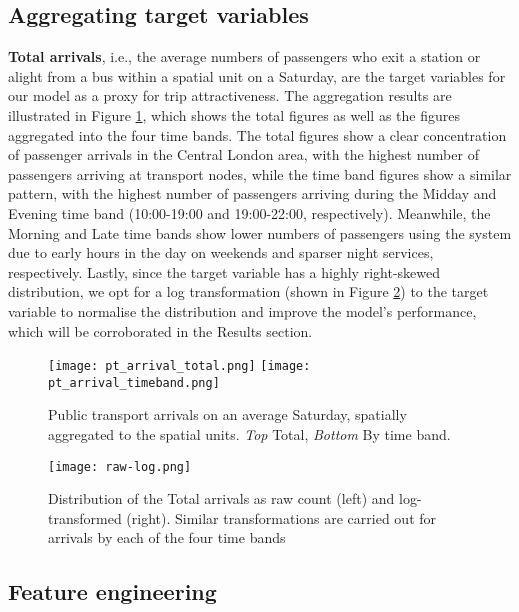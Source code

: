 \subsection{Aggregating target variables}

\textbf{Total arrivals}, i.e., the average numbers of passengers who exit a station or alight from a bus within a spatial unit on a Saturday, are the target variables for our model as a proxy for trip attractiveness. The aggregation results are illustrated in Figure \ref{fig:ptarrival}, which shows the total figures as well as the figures aggregated into the four time bands. The total figures show a clear concentration of passenger arrivals in the Central London area, with the highest number of passengers arriving at transport nodes, while the time band figures show a similar pattern, with the highest number of passengers arriving during the Midday and Evening time band (10:00-19:00 and 19:00-22:00, respectively). Meanwhile, the Morning and Late time bands show lower numbers of passengers using the system due to early hours in the day on weekends and sparser night services, respectively. Lastly, since the target variable has a highly right-skewed distribution, we opt for a log transformation (shown in Figure \ref{fig:rawlog}) to the target variable to normalise the distribution and improve the model's performance, which will be corroborated in the Results section.

\begin{figure}[!ht]
    \centering
    \texttt{[image: pt\_arrival\_total.png]}
    \centering
    \texttt{[image: pt\_arrival\_timeband.png]}
    \captionsetup{justification=centering}
    \caption{Public transport arrivals on an average Saturday, spatially aggregated to the spatial units. \textit{Top} Total, \textit{Bottom} By time band.}
    \label{fig:ptarrival}
\end{figure}

\begin{figure}[!hb]
    \centering
    \texttt{[image: raw-log.png]}
    \captionsetup{justification=centering}
    \caption{Distribution of the Total arrivals as raw count (left) and log-transformed (right). Similar transformations are carried out for arrivals by each of the four time bands}
    \label{fig:rawlog}
\end{figure}

\subsection{Feature engineering}

